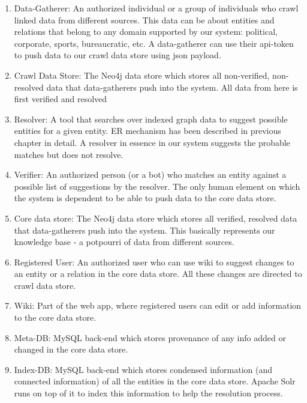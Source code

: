 \begin{enumerate}
    
    \item Data-Gatherer: An authorized individual or a group of individuals who crawl linked data from different sources. This data can be about entities and relations that belong to any domain supported by our system: political, corporate, sports, bureaucratic, etc. A data-gatherer can use their api-token to push data to our crawl data store using json payload.

    \item Crawl Data Store: The Neo4j data store which stores all non-verified, non-resolved data that data-gatherers push into the system. All data from here is first verified and resolved  

    \item Resolver: A tool that searches over indexed graph data to suggest possible entities for a given entity. ER mechanism has been described in previous chapter in detail. A resolver in essence in our system suggests the probable matches but does not resolve.

    \item Verifier: An authorized person (or a bot) who matches an entity against a possible list of suggestions by the resolver. The only human element on which the system is dependent to be able to push data to the core data store.

    \item Core data store: The Neo4j data store which stores all verified, resolved data that data-gatherers push into the system.  This basically represents our knowledge base - a potpourri of data from different sources.

    \item Registered User: An authorized user who can use wiki to suggest changes to an entity or a relation in the core data store. All these changes are directed to crawl data store.   

    \item Wiki: Part of the web app, where registered users can edit or add information to the core data store.

    \item Meta-DB: MySQL back-end which stores provenance of any info added or changed in the core data store.

    \item Index-DB: MySQL back-end which stores condensed information (and connected information) of all the entities in the core data store. Apache Solr runs on top of it to index this information to help the resolution process. 


\end{enumerate}
